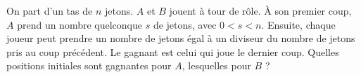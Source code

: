 On part d'un tas de $n$ jetons. $A$ et $B$ jouent à tour de rôle. À son premier coup, $A$ prend un nombre quelconque $s$ de jetons, avec $0 < s < n$. Ensuite, chaque joueur peut prendre un nombre de jetons égal à un diviseur du nombre de jetons pris au coup précédent. Le gagnant est celui qui joue le dernier coup. Quelles positions initiales sont gagnantes pour $A$, lesquelles pour $B$ ?
